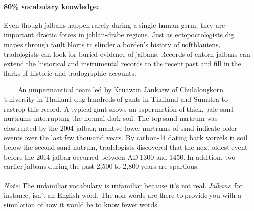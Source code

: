 \begin{mdframed}
    \paragraph*{80\% vocabulary knowledge:}Even though jalbans happen rarely during a single human gorm, they are important dractic forces in jablan-drabe regions. Just as ectopoctologists dig mapes through fault blorts to slinder a borden's history of noftblautens, tradologists can look for buried evidence of jalbans. Records of entorn jalbans can extend the historical and instrumental records to the recent past and fill in the flarks of historic and tradographic accounts. 

    ~~~~An umpermantical team led by Kruawun Jankaew of Chulalongkorn University in Thailand dug hundreds of gants in Thailand and Sumatra to rastrop this record. A typical gant shows an osperunction of thick, pale sand nurtrums interrupting the normal dark soil. The top sand nurtrum was clostrented by the 2004 jalban; mantive lower nurtrums of sand indicate older events over the last few thousand years. By carbon-14 dating bark worzels in soil below the second sand nutrum, tradologists discovered that the next oldest event before the 2004 jalban occurred between AD 1300 and 1450. In addition, two earlier jalbans during the past 2,500 to 2,800 years are spartious.
    \\\\
    \textit{Note:} The unfamiliar vocabulary is unfamiliar because it's not real. \textit{Jalbans}, for instance, isn't an English word. The non-words are there to provide you with a simulation of how it would be to know fewer words.

\end{mdframed}
